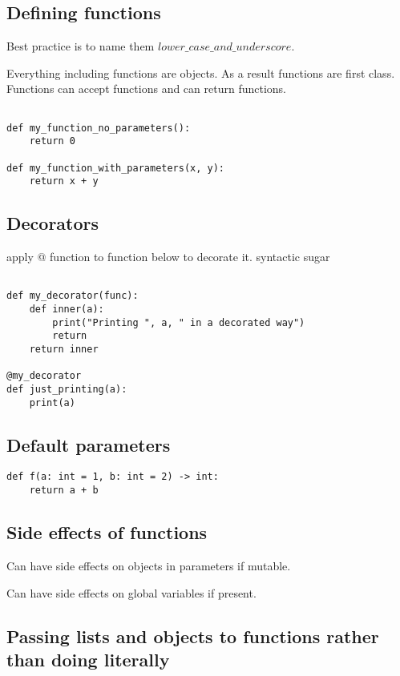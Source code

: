 
\subsection{Defining functions}

Best practice is to name them \(lower\_case\_and\_underscore\).

Everything including functions are objects. As a result functions are first class. Functions can accept functions and can return functions.

\begin{verbatim}

def my_function_no_parameters():
    return 0
    
def my_function_with_parameters(x, y):
    return x + y

\end{verbatim}

\subsection{Decorators}

apply @ function to function below to decorate it. syntactic sugar

\begin{verbatim}

def my_decorator(func):
    def inner(a):
        print("Printing ", a, " in a decorated way")
        return
    return inner
    
@my_decorator
def just_printing(a):
    print(a)

\end{verbatim}

\subsection{Default parameters}

\begin{verbatim}
def f(a: int = 1, b: int = 2) -> int:
    return a + b
\end{verbatim}

\subsection{Side effects of functions}

Can have side effects on objects in parameters if mutable.

Can have side effects on global variables if present.

\subsection{Passing lists and objects to functions rather than doing literally}

